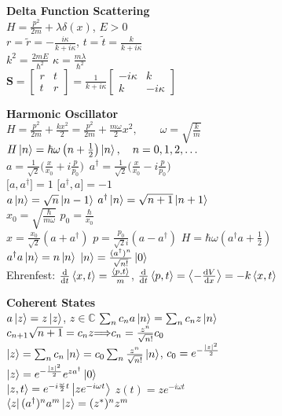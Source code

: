 \documentclass[11pt, a4paper]{article}
\newcommand{\newsec}[1]{\vspace{2mm}\textbf{#1}\\}
\newcommand{\mat}[1]{\mathbf{#1}} %
\let\spaceyimplies\implies
\renewcommand{\implies}{\hspace{-1mm}\spaceyimplies\hspace{-1mm}}
\begin{document}
\begin{multicols}{2}
 
 
 \newsec{Delta Function Scattering}
$ H = \frac{p^{2}}{2m} + \lambda \delta (x) $, \quad $ E > 0 $\\
$ r = \tilde{r} = -\frac{i\kappa}{k + i\kappa} $, \quad $ t = \tilde{t} = \frac{k}{k + i\kappa} $\\
$ k^{2} = \frac{2mE}{\hbar^{2}} $ \qquad  $ \kappa = \frac{m\lambda}{\hbar^{2}} $\\
$ \mat{S} =  
\begin{bmatrix}
	r & t\\
	t & r
\end{bmatrix}
= \frac{1}{k + i \kappa} 
\begin{bmatrix}
	- i \kappa & k\\
	k & - i \kappa
\end{bmatrix} $

 

 
\newsec{Harmonic Oscillator}
$ H = \frac{p^{2}}{2m} + \frac{kx^{2}}{2} = \frac{p^{2}}{2m} + \frac{m\omega}{2}x^{2}, \qquad \omega = \sqrt{\frac{k}{m}} $\\
$ H \ket{n} = \hbar \omega \left(n + \frac{1}{2}\right)\ket{n}, \quad n = 0, 1, 2, \ldots $\\
$ a = \frac{1}{\sqrt{2}}\big(\frac{x}{x_{0}} + i\frac{p}{p_{0}}\big) $ \qquad  $\, a^{\dagger} = \frac{1}{\sqrt{2}}\big(\frac{x}{x_{0}} - i\frac{p}{p_{0}}\big) $\\
$ \big[a, a^{\dagger}\big] = 1 $ \qquad \qquad  \quad $ \big[ a^{\dagger}, a\big] = -1 $\\
$ a\ket{n} = \sqrt{n}\ket{n-1} $ \qquad $ a^{\dagger} \ket{n} = \sqrt{n + 1} \ket{n+1} $ \\
$ x_{0} = \sqrt{\frac{\hbar}{m\omega}} $ \qquad $ p_{0} = \frac{\hbar}{x_{0}} $\\
$ x = \frac{x_{0}}{\sqrt{2}}(a + a^{\dagger}) $ \quad $ p = \frac{p_{0}}{\sqrt{2}i}(a - a^{\dagger}) $ \quad $ H = \hbar \omega\left (a^{\dagger}a + \frac{1}{2}\right ) $\\
$ a^{\dagger}a \ket{n} = n \ket{n}$ \qquad $ \ket{n} = \frac{(a^{\dagger})^{n}}{\sqrt{n!}} \ket{0} $\\
Ehrenfest: $ \dv{t}\ev{x, t} = \frac{\ev{p, t}}{m} $,  $\dv{t}\ev{p, t} = \ev{-\dv{V}{x}} = -k\ev{x, t} $



\newsec{Coherent States}
$ a \ket{z} = z \ket{z} $, $ z \in \mathbb{C} $ \qquad $ \sum_{n} c_{n} a \ket{n} = \sum_{n} c_{n} z \ket{n} $\\
$ c_{n+1}\sqrt{n+1} = c_{n}z \implies c_{n} = \frac{z^{n}}{\sqrt{n!}}c_{0} $\\
$ \ket{z} = \sum_{n}c_{n} \ket{n} = c_{0} \sum_{n} \frac{z^{n}}{\sqrt{n!}}\ket{n} $, \quad $ c_{0} = e^{-\frac{\abs{z}^{2}}{2}} $\\
$ \ket{z} =  e^{-\frac{\abs{z}^{2}}{2}}  e^{za^{\dagger}} \ket{0} $\\
$ \ket{z, t} = e^{-i \frac{\omega}{2}t} \ket{z e^{-i\omega t}} $ \qquad $ z(t) = ze^{-i\omega t} $\\
$ \bra{z}(a^{\dagger})^{n}a^{m}\ket{z} = (z^{*})^{n}z^{m} $


\end{multicols}
\end{document}
